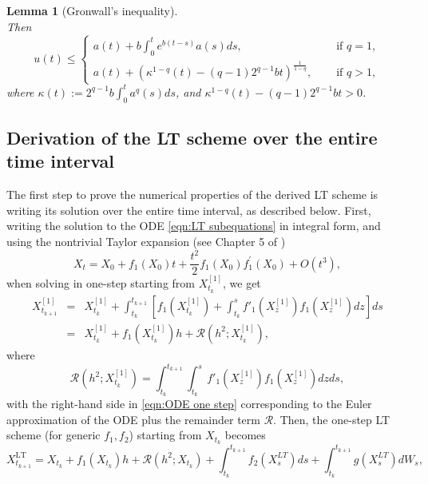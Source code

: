 \documentclass[a4paper,12pt]{article}
\numberwithin{equation}{section}
\theoremstyle{plain}
\newtheorem{lemma}[theorem]{Lemma}
\theoremstyle{definition}
\begin{document}
\begin{appendix}
\begin{lemma}[Gronwall's inequality]
\begin{equation*}
    \end{equation*}
    Then 
    \begin{equation}
        u(t)\leq\begin{cases}
             a(t)+b\int_0^t e^{b(t-s)} a(s) ds,\quad & \text { if } q=1 ,\\
             a(t)+\left(\kappa^{1-q}(t)-(q-1)2^{q-1}bt\right)^{\frac{1}{1-q}},\quad & \text { if } q>1,
        \end{cases}\label{eqn:Gronwall inequality}
    \end{equation}
    where $\kappa(t):=2^{q-1}b\int_0^t a^q(s)ds$, and $\kappa^{1-q}(t)-(q-1)2^{q-1}bt>0$.
\end{lemma}

\subsection{Derivation of the LT scheme over the entire time interval}
\label{AuxiliaryNum}
The first step to prove the numerical properties of the derived LT scheme is writing its solution over the entire time interval, as described below. First, writing the solution to the ODE \eqref{eqn:LT subequations} in integral form, and using the nontrivial Taylor expansion 
(see Chapter 5 of \cite{kloeden_numerical_1992})
\begin{equation}\label{eqn:ODE expansion}
X_t=X_0+f_1(X_0)t+\frac{t^2}{2}f_1(X_0)f^{\prime}_1(X_0)+O(t^3),
\end{equation}
when solving in one-step starting from $X_{t_k}^{[1]}$, we get
\begin{eqnarray}
    \nonumber X^{[1]}_{t_{k+1}}&=&X^{[1]}_{t_k}+\int_{t_k}^{t_{k+1}}\left[f_1(X^{[1]}_{t_k})+\int_{t_k}^s f'_1(X^{[1]}_z)
    f_1(X^{[1]}_z)dz\right]ds\\
    \label{eqn:ODE one step}&=&X_{t_k}^{[1]}+f_1(X^{[1]}_{t_k})h+\mathcal{R}(h^2;X^{[1]}_{t_k}),
\end{eqnarray}
where 
\begin{equation*}
    \mathcal{R}(h^2;X^{[1]}_{t_k})=\int_{t_k}^{t_{k+1}}\int_{t_k}^s 
    f'_1(X^{[1]}_z)
    f_1(X^{[1]}_z)dzds,
\end{equation*}
with the right-hand side in \eqref{eqn:ODE one step} corresponding to the Euler approximation of the ODE plus the remainder term $\mathcal{R}$. 
Then, the one-step LT scheme (for generic $f_1, f_2$) starting from $X_{t_k}$ becomes 
\begin{equation}\label{eqn:LT one step}
    X^{\textrm{LT}}_{t_{k+1}}=X_{t_k}+f_1(X_{t_k})h+\mathcal{R}(h^2;X_{t_k})+\int_{t_k}^{t_{k+1}}f_2(X^{LT}_s)ds+\int_{t_k}^{t_{k+1}}g(X^{LT}_s)dW_s,

\end{equation}
\end{appendix}
\end{document}
